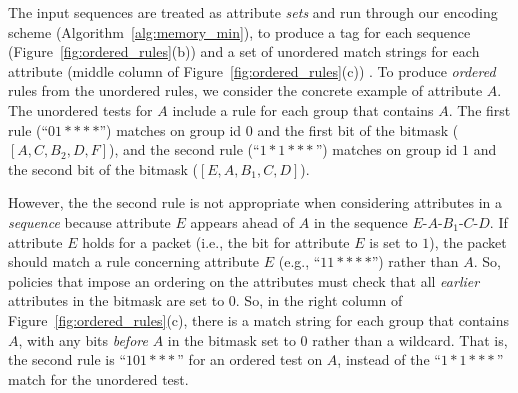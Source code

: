 The input sequences are treated as attribute \emph{sets} and run through our encoding scheme (Algorithm~\ref{alg:memory_min}), to produce a tag for each sequence (Figure~\ref{fig:ordered_rules}(b)) and a set of unordered match strings for each attribute (middle column of Figure~\ref{fig:ordered_rules}(c)) .  To produce \emph{ordered} rules from the unordered rules, we consider the concrete example of attribute $A$.  The unordered tests for $A$ include a rule for each group that contains $A$.  The first rule (``$01****$'') matches on group id $0$ and the first bit of the bitmask ($[A,C,B_2,D,F]$), and the second rule (``$1*1***$'') matches on group id $1$ and the second bit of the bitmask ($[E,A,B_1,C,D]$).

However, the the second rule is not appropriate when considering attributes in a \emph{sequence} because attribute $E$ appears ahead of $A$ in the sequence $E$-$A$-$B_1$-$C$-$D$.  If attribute $E$ holds for a packet (i.e., the bit for attribute $E$ is set to $1$), the packet should match a rule concerning attribute $E$ (e.g., ``$11****$'') rather than $A$.  So, policies that impose an ordering on the attributes must check that all \emph{earlier} attributes in the bitmask are set to $0$.  So, in the right column of Figure~\ref{fig:ordered_rules}(c), there is a match string for each group that contains $A$, with any bits \emph{before} $A$ in the bitmask set to $0$ rather than a wildcard.  That is, the second rule is ``$101***$'' for an ordered test on $A$, instead of the ``$1*1***$'' match for the unordered test.
